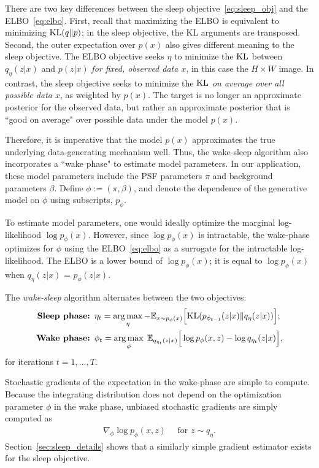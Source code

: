 There are two key differences between the sleep objective~\eqref{eq:sleep_obj} and the ELBO~\eqref{eq:elbo}. 
First, recall that maximizing the ELBO is equivalent to minimizing 
$\textrm{KL}(q\|p)$; in the sleep objective, the KL arguments are transposed. Second, the outer expectation over $p(x)$ also gives different meaning to the sleep objective. The ELBO objective seeks $\eta$ to minimize the $\textrm{KL}$ between $q_\eta(z | x)$ and $p(z | x)$ {\itshape for fixed, observed data $x$},
in this case the $H\times W$ image.
In contrast, the sleep objective seeks to minimize the $\textrm{KL}$ {\itshape on average over all possible data $x$}, as weighted by $p(x)$. 
The target is no longer an approximate posterior for the observed data, but rather an approximate posterior that is ``good on average" over possible data under the model $p(x)$.

Therefore, it is imperative that the model $p(x)$ approximates the true underlying data-generating mechanism well. 
Thus, the wake-sleep algorithm also incorporates a ``wake phase" to estimate model parameters.
In our application, these model parameters include the PSF parameters $\pi$ and background parameters $\beta$. Define 
$\phi:=(\pi, \beta)$, and denote the dependence of the generative model on $\phi$ using subscripts, $p_\phi$. 

To estimate model parameters, one would ideally optimize the marginal log-likelihood $\log p_\phi(x)$.
However, since $\log p_\phi(x)$ is intractable, the wake-phase optimizes for $\phi$ using the ELBO~\eqref{eq:elbo}
as a surrogate for the intractable log-likelihood. 
The ELBO is a lower bound of
$\log p_\phi(x)$; 
it is equal to $\log p_\phi(x)$ when $q_\eta(z | x)$ 
= $p_\phi(z | x)$. 

The {\itshape wake-sleep} algorithm alternates between the two objectives: 
\begin{align}
    \text{{\bf Sleep phase: }} & 
    \eta_{t} = \operatorname*{arg\,max}_{\eta} -\mathbb{E}_{x \sim p_\phi(x)}\Big[\textrm{KL}(p_{\phi_{t-1}}(z | x) \| q_\eta(z | x))\Big]
    \label{eq:sleep_phase_summary}; 
    \\
    \text{{\bf Wake phase: }} & \phi_{t} = \operatorname*{arg\,max}_{\phi}\; \mathbb{E}_{q_{\eta_t}(z | x)}\Big[\log p_{\phi}(x, z) - \log q_{\eta_t}(z | x)\Big],
    \label{eq:wake_phase_summary}
\end{align} 
for iterations $t = 1, ..., T$. 

Stochastic gradients of the expectation in the wake-phase are simple to compute. Because the integrating distribution does not depend on the optimization parameter $\phi$ in the wake phase, unbiased stochastic gradients are simply computed as 
\begin{align}
    \nabla_\phi \log p_\phi(x, z) \quad \text{ for } z\sim q_\eta. 
    \label{eq:mstep_grad}
\end{align}
Section~\ref{sec:sleep_details} shows that a similarly simple gradient estimator exists for the sleep objective.


